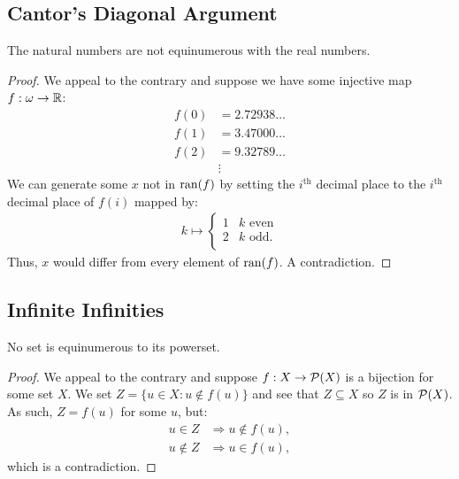 \subsection{Cantor's Diagonal Argument}

The natural numbers are not equinumerous with the real numbers.

\begin{proof}
    We appeal to the contrary and suppose we have some injective map
    $f : \omega \to \mathbb{R}$: \begin{align*}
        f(0) &= 2.72938 \ldots \\
        f(1) &= 3.47000 \ldots \\
        f(2) &= 9.32789 \ldots \\
        &\vdots 
    \end{align*} We can generate some $x$ not in $\operatorname{ran}(f)$ by
    setting the $i^{\text{th}}$ decimal place to the $i^{\text{th}}$
    decimal place of $f(i)$ mapped by: \begin{align*}
        k \mapsto \begin{cases}
            1 & k \text{ even} \\
            2 & k \text{ odd.} \\
        \end{cases}
    \end{align*} Thus, $x$ would differ from every element of $\operatorname{ran}(f)$.
    A contradiction.
\end{proof}

\subsection{Infinite Infinities}

No set is equinumerous to its powerset.

\begin{proof}
    We appeal to the contrary and suppose $f : X \to \mathcal{P}(X)$ is a bijection
    for some set $X$. We set $Z = \{u \in X : u \notin f(u)\}$ and see that
    $Z \subseteq X$ so $Z$ is in $\mathcal{P}(X)$. As such, $Z = f(u)$ for some
    $u$, but:
    \begin{align*}
        u \in Z &\Longrightarrow u \notin f(u), \\
        u \notin Z &\Longrightarrow u \in f(u),
    \end{align*} which is a contradiction.
\end{proof}
